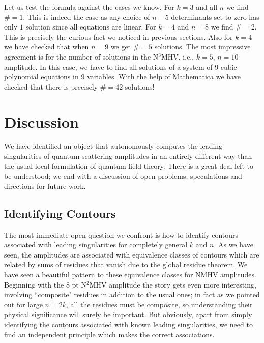 \documentclass[12pt]{article}
\begin{document}
Let us test the formula against the cases we know. For $k=3$ and all
$n$ we find $\#=1$. This is indeed the case as any choice of $n-5$
determinants set to zero has only $1$ solution since  all equations
are linear. For $k=4$ and $n=8$ we find $\# = 2$. This is precisely
the curious fact we noticed in previous sections. Also for $k=4$
we have checked that when $n=9$ we get $\# = 5$ solutions. The most
impressive agreement is for the number of solutions in the N$^3$MHV,
i.e., $k=5$, $n=10$ amplitude. In this case, we have to find all
solutions of a system of 9 cubic polynomial equations in 9
variables. With the help of Mathematica we have checked that there
is precisely $\# = 42$ solutions!

\section{Discussion}

We have identified an object that autonomously computes the leading singularities of quantum scattering amplitudes in an entirely different way than the usual local formulation of quantum field theory. There is a great deal left to be understood; we end with a discussion of open problems, speculations and directions for future work.

\subsection{Identifying Contours}

The most immediate open question we confront is how to identify contours associated with leading singularities for completely general $k$ and $n$. As we have seen, the amplitudes are associated with equivalence classes of contours which are related by sums of residues that vanish due to the global residue theorem. We have seen a beautiful pattern to these equivalence classes for NMHV amplitudes. Beginning with the 8 pt N$^2$MHV amplitude the story gets even more interesting, involving ``composite" residues in addition to the usual ones; in fact as we pointed out for large $n = 2k$, all the residues must be composite, so understanding their physical significance will surely be important. But obviously, apart from simply identifying the contours associated with known leading singularities, we need to find an independent principle which makes the correct associations.
\end{document}
